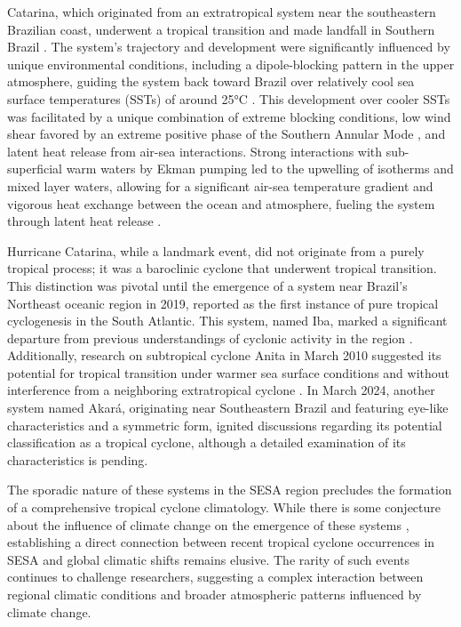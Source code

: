 Catarina, which originated from an extratropical system near the southeastern Brazilian coast, underwent a tropical transition and made landfall in Southern Brazil \citep{pezza2005first}. The system's trajectory and development were significantly influenced by unique environmental conditions, including a dipole-blocking pattern in the upper atmosphere, guiding the system back toward Brazil over relatively cool sea surface temperatures (SSTs) of around 25°C \citep{mctaggart2006analysis}. This development over cooler SSTs was facilitated by a unique combination of extreme blocking conditions, low wind shear favored by an extreme positive phase of the Southern Annular Mode \citep{pezza2005first,pezza2009climate}, and latent heat release from air-sea interactions. Strong interactions with sub-superficial warm waters by Ekman pumping led to the upwelling of isotherms and mixed layer waters, allowing for a significant air-sea temperature gradient and vigorous heat exchange between the ocean and atmosphere, fueling the system through latent heat release \citep{vianna2010interactions,pereira2010new}.

Hurricane Catarina, while a landmark event, did not originate from a purely tropical process; it was a baroclinic cyclone that underwent tropical transition. This distinction was pivotal until the emergence of a system near Brazil's Northeast oceanic region in 2019, reported as the first instance of pure tropical cyclogenesis in the South Atlantic. This system, named Iba, marked a significant departure from previous understandings of cyclonic activity in the region \citep{reboita2021iba}. Additionally, research on subtropical cyclone Anita in March 2010 suggested its potential for tropical transition under warmer sea surface conditions and without interference from a neighboring extratropical cyclone \citep{dias2011energy,reboita2019subtropical}. In March 2024, another system named Akará, originating near Southeastern Brazil and featuring eye-like characteristics and a symmetric form, ignited discussions regarding its potential classification as a tropical cyclone, although a detailed examination of its characteristics is pending.

The sporadic nature of these systems in the SESA region precludes the formation of a comprehensive tropical cyclone climatology. While there is some conjecture about the influence of climate change on the emergence of these systems \citep[e.g.,]{pezza2005first,mctaggart2006analysis,pezza2009climate,pereira2010new}, establishing a direct connection between recent tropical cyclone occurrences in SESA and global climatic shifts remains elusive. The rarity of such events continues to challenge researchers, suggesting a complex interaction between regional climatic conditions and broader atmospheric patterns influenced by climate change.

